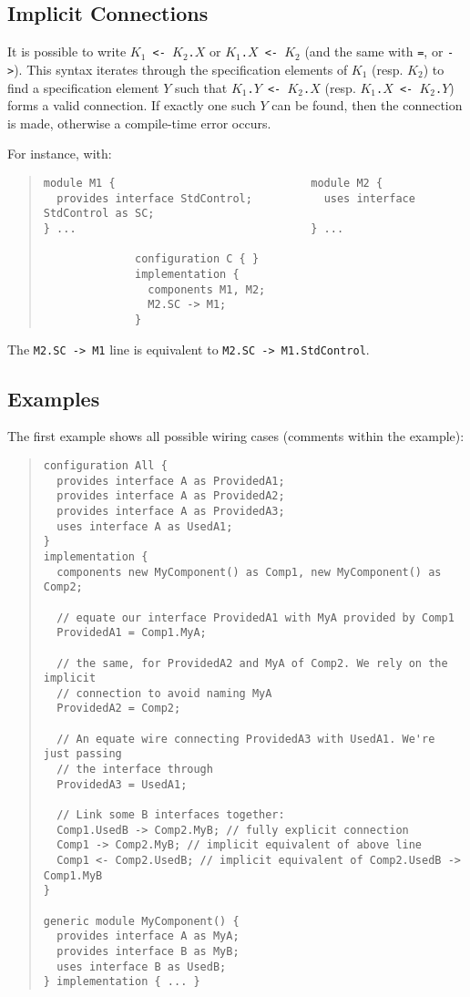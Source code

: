 \documentclass[11pt,letterpaper]{article}
\newcommand{\kw}[1]{{\tt #1}}
\newcommand{\code}[1]{{\tt #1}}
\begin{document}
\subsection{Implicit Connections}
\label{sec:implicit}

It is possible to write \code{$K_1$ <- $K_2$.$X$} or \code{$K_1$.$X$ <-
$K_2$} (and the same with \kw{=}, or \kw{->}). This syntax iterates through
the specification elements of $K_1$ (resp. $K_2$) to find a specification
element $Y$ such that \code{$K_1$.$Y$ <- $K_2$.$X$} (resp. \code{$K_1$.$X$
<- $K_2$.$Y$}) forms a valid connection. If exactly one such $Y$ can
be found, then the connection is made, otherwise a compile-time error
occurs.

For instance, with:
\begin{quote} \begin{verbatim}
module M1 {                              module M2 {
  provides interface StdControl;           uses interface StdControl as SC;
} ...                                    } ...

              configuration C { }
              implementation {
                components M1, M2;
                M2.SC -> M1;
              }
\end{verbatim} \end{quote}
The \code{M2.SC -> M1} line is equivalent to \code{M2.SC -> M1.StdControl}.

\subsection{Examples}

The first example shows all possible wiring cases (comments within the
example):
\begin{quote}
\begin{verbatim}
configuration All {
  provides interface A as ProvidedA1;
  provides interface A as ProvidedA2;
  provides interface A as ProvidedA3;
  uses interface A as UsedA1;
}
implementation {
  components new MyComponent() as Comp1, new MyComponent() as Comp2;

  // equate our interface ProvidedA1 with MyA provided by Comp1
  ProvidedA1 = Comp1.MyA; 

  // the same, for ProvidedA2 and MyA of Comp2. We rely on the implicit
  // connection to avoid naming MyA
  ProvidedA2 = Comp2;

  // An equate wire connecting ProvidedA3 with UsedA1. We're just passing
  // the interface through
  ProvidedA3 = UsedA1;

  // Link some B interfaces together:
  Comp1.UsedB -> Comp2.MyB; // fully explicit connection
  Comp1 -> Comp2.MyB; // implicit equivalent of above line
  Comp1 <- Comp2.UsedB; // implicit equivalent of Comp2.UsedB -> Comp1.MyB
}

generic module MyComponent() {
  provides interface A as MyA;
  provides interface B as MyB;
  uses interface B as UsedB;
} implementation { ... }
\end{verbatim}
\end{quote}
\end{document}
